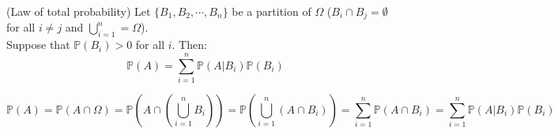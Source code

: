 \documentclass{huhtakm-template-book}
\newcommand{\prob}{\mathbb{P}}
\begin{document}
    \begin{lem}(Law of total probability)
        Let $\{B_{1},B_{2},\cdots,B_{n}\}$ be a partition of $\Omega$ ($B_{i}\cap B_{j}=\emptyset$ for all $i\neq j$ and $\bigcup_{i=1}^{n}=\Omega$).\\
        Suppose that $\prob(B_{i})>0$ for all $i$. Then:
        \begin{equation*}
            \prob(A)=\sum_{i=1}^{n}\prob(A|B_{i})\prob(B_{i})
        \end{equation*}
    \end{lem}
    \begin{proofing}
        \begin{equation*}
            \prob(A)=\prob(A\cap\Omega)=\prob\left(A\cap\left(\bigcup_{i=1}^{n}B_{i}\right)\right)=\prob\left(\bigcup_{i=1}^{n}(A\cap B_{i})\right)=\sum_{i=1}^{n}\prob(A\cap B_{i})=\sum_{i=1}^{n}\prob(A|B_{i})\prob(B_{i})
        \end{equation*}
    \end{proofing}

\newpage
\end{document}
